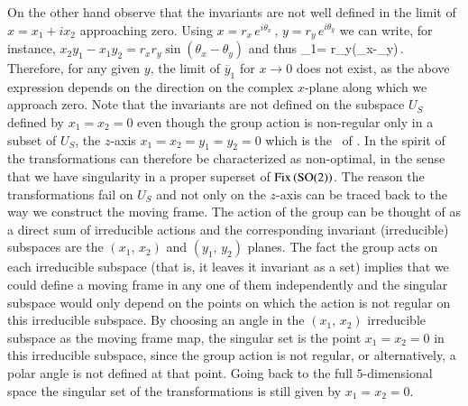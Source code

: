 On the other hand observe that the invariants are not well defined
in the limit of $x=x_1+i x_2$ approaching zero.
Using $x=r_x\, e^{i\theta_x}\,,\, y=r_y\, e^{i\theta_y}$ we can write,
for instance, $x_2 y_1-x_1 y_2 = r_x r_y \sin(\theta_x-\theta_y)$
and thus
\beq
        _1= r_y\sin(\theta_x-\theta_y)\,.
\eeq
Therefore, for any given $y$, the limit of $\overline{y}_1$ for $x \rightarrow 0$
does not exist, as the above expression depends on the direction
on the complex $x$-plane along which we approach zero.
Note that the invariants are not defined on
the subspace $U_S$ defined by $x_1=x_2=0$ even though the
group action is non-regular only in a subset of $U_S$, the
$z$-axis $x_1=x_2=y_1=y_2=0$ which is the \fixedsp\ of .
In the spirit of  the transformations 
can therefore be characterized as non-optimal, in the sense
that we have singularity in a proper superset of $\mathrm{Fix}\left(\textrm{SO}(2)\right)$.
The reason the transformations fail on $U_S$ and not only on the $z$-axis
can be traced back to the way we construct the moving frame. The action
of the group can be thought of as a direct sum of irreducible
actions and the corresponding invariant (irreducible)
subspaces are the $(x_1,\,x_2)$ and $(y_1,\,y_2)$
planes.
The
fact the group acts on each irreducible subspace (that is, it
leaves it invariant as a set) implies that we could define a
moving frame in any one of them independently and the
singular subspace would only depend on the points on which
the action is not regular on this irreducible subspace. By
choosing an angle in the $(x_1,\,x_2)$ irreducible subspace
as the moving frame map, the singular set is the point
$x_1=x_2=0$ in this irreducible subspace, since the group
action is not regular, or alternatively, a polar
angle is not defined at that point. Going back to the full
$5$-dimensional space the singular set of the transformations
is still given by $x_1=x_2=0$.

